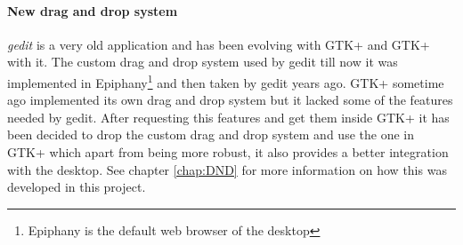\paragraph{New drag and drop system}

\emph{gedit} is a very old application and has been evolving with GTK+ and GTK+
with it. The custom drag and drop system used by gedit till now it was implemented 
in Epiphany\footnote{Epiphany is the default web browser of the \GNOME desktop} 
and then taken by gedit years ago. GTK+ sometime ago implemented its own drag 
and drop system but it lacked some of the features needed by gedit. After requesting 
this features and get them inside GTK+ it has been decided to drop the custom 
drag and drop system and use the one in GTK+ which apart from being more robust, 
it also provides a better integration with the desktop. See chapter \ref{chap:DND}
for more information on how this was developed in this project.


